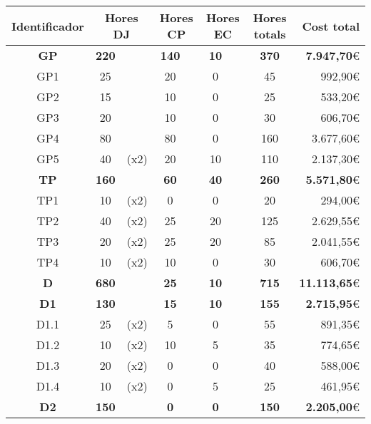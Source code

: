 \begin{table}[H]
    \centering
    \begin{tabular}{|c|cc|cc|cc|c|r|}
    \hline
    \textbf{Identificador} & \multicolumn{2}{c|}{\textbf{Hores DJ}} & \multicolumn{2}{c|}{\textbf{Hores CP}} & \multicolumn{2}{c|}{\textbf{Hores EC}} & \textbf{Hores totals}   & \textbf{Cost total}      \\ \hline
    \textbf{GP}	&	\textbf{220}	&	&	\textbf{140}	&	&	\textbf{10}	&	&	\textbf{370}	&	\textbf{7.947,70}\euro	\\	\hline
    GP1	&	25	&	&	20	&	&	0	&	&	45	&	992,90\euro	\\	\hline
    GP2	&	15	&	&	10	&	&	0	&	&	25	&	533,20\euro	\\	\hline
    GP3	&	20	&	&	10	&	&	0	&	&	30	&	606,70\euro	\\	\hline
    GP4	&	80	&	&	80	&	&	0	&	&	160	&	3.677,60\euro	\\	\hline
    GP5	&	40	&	{\footnotesize	(x2)}	&	20	&	&	10	&	&	110	&	2.137,30\euro	\\	\hline
    \textbf{TP}	&	\textbf{160}	&	&	\textbf{60}	&	&	\textbf{40}	&	&	\textbf{260}	&	\textbf{5.571,80}\euro	\\	\hline
    TP1	&	10	&	{\footnotesize	(x2)}	&	0	&	&	0	&	&	20	&	294,00\euro	\\	\hline
    TP2	&	40	&	{\footnotesize	(x2)}	&	25	&	&	20	&	&	125	&	2.629,55\euro	\\	\hline
    TP3	&	20	&	{\footnotesize	(x2)}	&	25	&	&	20	&	&	85	&	2.041,55\euro	\\	\hline
    TP4	&	10	&	{\footnotesize	(x2)}	&	10	&	&	0	&	&	30	&	606,70\euro	\\	\hline
    \textbf{D}	&	\textbf{680}	&	&	\textbf{25}	&	&	\textbf{10}	&	&	\textbf{715}	&	\textbf{11.113,65}\euro	\\	\hline
    \textbf{D1}	&	\textbf{130}	&	&	\textbf{15}	&	&	\textbf{10}	&	&	\textbf{155}	&	\textbf{2.715,95}\euro	\\	\hline
    D1.1	&	25	&	{\footnotesize	(x2)}	&	5	&	&	0	&	&	55	&	891,35\euro	\\	\hline
    D1.2	&	10	&	{\footnotesize	(x2)}	&	10	&	&	5	&	&	35	&	774,65\euro	\\	\hline
    D1.3	&	20	&	{\footnotesize	(x2)}	&	0	&	&	0	&	&	40	&	588,00\euro	\\	\hline
    D1.4	&	10	&	{\footnotesize	(x2)}	&	0	&	&	5	&	&	25	&	461,95\euro	\\	\hline
    \textbf{D2}	&	\textbf{150}	&	&	\textbf{0}	&	&	\textbf{0}	&	&	\textbf{150}	&	\textbf{2.205,00}\euro	\\	\hline

\end{tabular}
\end{table}
